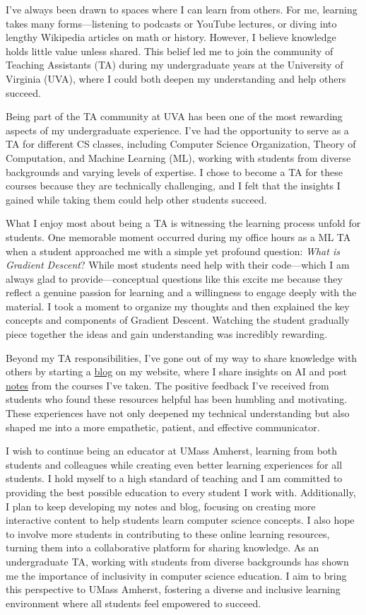 \documentclass[10pt]{article}
\begin{document}
I've always been drawn to spaces where I can learn from others. For me, learning takes many forms—listening to podcasts or YouTube lectures, or diving into lengthy Wikipedia articles on math or history. However, I believe knowledge holds little value unless shared. This belief led me to join the community of Teaching Assistants (TA) during my undergraduate years at the University of Virginia (UVA), where I could both deepen my understanding and help others succeed.

Being part of the TA community at UVA has been one of the most rewarding aspects of my undergraduate experience. I've had the opportunity to serve as a TA for different CS classes, including Computer Science Organization, Theory of Computation, and Machine Learning (ML), working with students from diverse backgrounds and varying levels of expertise. I chose to become a TA for these courses because they are technically challenging, and I felt that the insights I gained while taking them could help other students succeed.

What I enjoy most about being a TA is witnessing the learning process unfold for students. One memorable moment occurred during my office hours as a ML TA when a student approached me with a simple yet profound question: \textit{What is Gradient Descent}? While most students need help with their code—which I am always glad to provide—conceptual questions like this excite me because they reflect a genuine passion for learning and a willingness to engage deeply with the material. I took a moment to organize my thoughts and then explained the key concepts and components of Gradient Descent. Watching the student gradually piece together the ideas and gain understanding was incredibly rewarding.

Beyond my TA responsibilities, I've gone out of my way to share knowledge with others by starting a \href{https://www.brandonyifanyang.com/blog}{blog} on my website, where I share insights on AI and post \href{https://www.brandonyifanyang.com/notes}{notes} from the courses I've taken. The positive feedback I've received from students who found these resources helpful has been humbling and motivating. These experiences have not only deepened my technical understanding but also shaped me into a more empathetic, patient, and effective communicator.

I wish to continue being an educator at UMass Amherst, learning from both students and colleagues while creating even better learning experiences for all students. I hold myself to a high standard of teaching and I am committed to providing the best possible education to every student I work with. Additionally, I plan to keep developing my notes and blog, focusing on creating more interactive content to help students learn computer science concepts. I also hope to involve more students in contributing to these online learning resources, turning them into a collaborative platform for sharing knowledge. As an undergraduate TA, working with students from diverse backgrounds has shown me the importance of inclusivity in computer science education. I aim to bring this perspective to UMass Amherst, fostering a diverse and inclusive learning environment where all students feel empowered to succeed.
\end{document}
